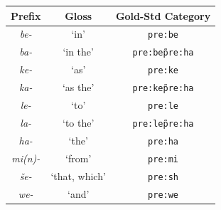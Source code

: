 \begin{description}
\begin{table}[t]
\centering
\setlength{\extrarowheight}{6pt}
\begin{tabular}{ccc}
\toprule
Prefix & Gloss & Gold-Std Category \\
\midrule
\textit{be-} & `in'	& \texttt{pre:be}   \\                    
\textit{ba-}	&`in the' & \texttt{pre:be\~pre:ha}    \\                              
\textit{ke-}	&`as'  & \texttt{pre:ke} \\                
\textit{ka-}	& `as the' & \texttt{pre:ke\~pre:ha} \\          
\textit{le-}	& `to' & \texttt{pre:le}  \\               
\textit{la-}	& `to the' & \texttt{pre:le\~pre:ha} \\
\textit{ha-}	& `the' & \texttt{pre:ha}  \\      
\textit{mi(n)-} &`from' & \texttt{pre:mi}  \\               
\textit{\v{s}e-}	& `that, which' & \texttt{pre:sh} \\
\textit{we-} & `and' & \texttt{pre:we} \\
\bottomrule
\end{tabular}
\end{table}
%			
%		
%		
%
%		
\end{description}
	
